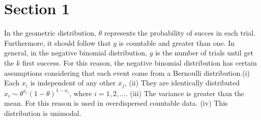 \documentclass[11pt, a4paper, top=4cm,bottom=3.5cm, right=3cm,left=3cm]{SimpleNotes}
\begin{document}
\section{Section 1}
In the geometric distribution, $\theta$ represents the probability of succes in each trial. Furthermore, it should follow that $y$ is countable and greater than one. In general, in the negative binomial distribution, $y$ is the number of trials until get the $k$ first success. For this reason, the negative binomial distribution has certain assumptions considering that each event come from a Bernoulli distribution.(i) Each $x_i$ is independent of any other $x_j$, (ii) They are identically distributed $x_i\sim\theta^{x_i}(1-\theta)^{1-x_i}$, where $i =1,2,...$. (iii) The variance is greater than the mean. For this reason is used in overdispersed countable data. (iv) This distribution is unimodal.



%
%
\end{document}
